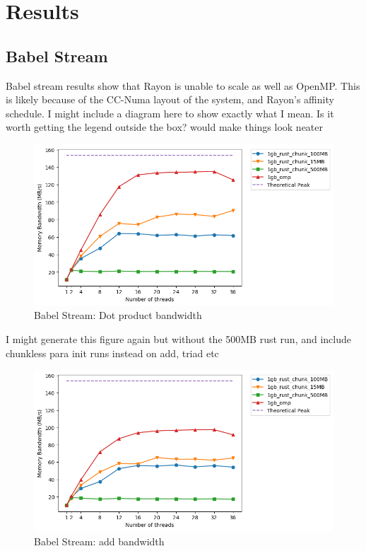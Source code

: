 \chapter{Results}
\section{Babel Stream}\label{sec:res-babel}
Babel stream results show that Rayon is unable to scale as well as OpenMP\@. This is likely because of the CC-Numa layout of the system, and Rayon's affinity schedule. I might include a diagram here to show exactly what I mean. Is it worth getting the legend outside the box? would make things look neater
\begin{figure}[h]\label{fig:babel-dot}
\centering
\includegraphics[width=\linewidth]{figs/babel/Dot.png}
\caption{Babel Stream: Dot product bandwidth}
\end{figure}

I might generate this figure again but without the 500MB rust run, and include chunkless para init runs instead on add, triad etc
\begin{figure}[h]\label{fig:babel-add}
\centering
\includegraphics[width=\linewidth]{figs/babel/Add.png}
\caption{Babel Stream: add bandwidth}
\end{figure}


